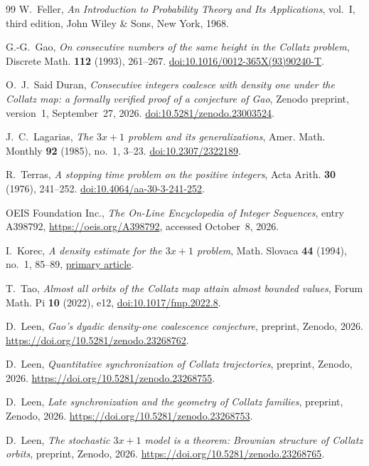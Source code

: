 \documentclass[11pt]{amsart}
\theoremstyle{definition}
\theoremstyle{remark}
\begin{document}
\begin{thebibliography}{99}
W.~Feller,
\emph{An Introduction to Probability Theory and Its Applications},
vol.~I, third edition, John Wiley \& Sons, New York, 1968.

G.-G.~Gao,
\emph{On consecutive numbers of the same height in the Collatz problem},
Discrete Math. \textbf{112} (1993), 261--267.
\href{https://doi.org/10.1016/0012-365X(93)90240-T}
{doi:10.1016/0012-365X(93)90240-T}.

O.~J.~Said Duran,
\emph{Consecutive integers coalesce with density one under the Collatz map:
a formally verified proof of a conjecture of Gao},
Zenodo preprint, version~1, September~27, 2026.
\href{https://doi.org/10.5281/zenodo.23003524}{doi:10.5281/zenodo.23003524}.

J.~C.~Lagarias,
\emph{The $3x+1$ problem and its generalizations},
Amer. Math. Monthly \textbf{92} (1985), no.~1, 3--23.
\href{https://doi.org/10.2307/2322189}{doi:10.2307/2322189}.

R.~Terras,
\emph{A stopping time problem on the positive integers},
Acta Arith. \textbf{30} (1976), 241--252.
\href{https://doi.org/10.4064/aa-30-3-241-252}{doi:10.4064/aa-30-3-241-252}.

OEIS Foundation Inc.,
\emph{The On-Line Encyclopedia of Integer Sequences}, entry A398792,
\url{https://oeis.org/A398792}, accessed October~8, 2026.

I.~Korec, \emph{A density estimate for the $3x+1$ problem},
Math. Slovaca \textbf{44} (1994), no.~1, 85--89,
\href{https://dml.cz/bitstream/handle/10338.dmlcz/133225/MathSlov_44-1994-1_8.pdf}{primary article}.

T.~Tao, \emph{Almost all orbits of the Collatz map attain almost bounded values},
Forum Math. Pi \textbf{10} (2022), e12,
\href{https://doi.org/10.1017/fmp.2022.8}{doi:10.1017/fmp.2022.8}.

D.~Leen, \emph{Gao's dyadic density-one coalescence conjecture},
preprint, Zenodo, 2026.
\url{https://doi.org/10.5281/zenodo.23268762}.

D.~Leen, \emph{Quantitative synchronization of Collatz trajectories},
preprint, Zenodo, 2026.
\url{https://doi.org/10.5281/zenodo.23268755}.

D.~Leen, \emph{Late synchronization and the geometry of Collatz families},
preprint, Zenodo, 2026.
\url{https://doi.org/10.5281/zenodo.23268753}.

D.~Leen, \emph{The stochastic $3x+1$ model is a theorem: Brownian
structure of Collatz orbits}, preprint, Zenodo, 2026.
\url{https://doi.org/10.5281/zenodo.23268765}.

\end{thebibliography}
\end{document}
